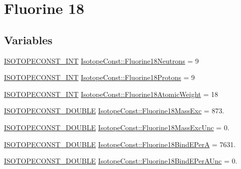 \hypertarget{group___isotope_const-_fluorine-_f18}{}\section{Fluorine 18}
\label{group___isotope_const-_fluorine-_f18}
\subsection*{Variables}
\begin{DoxyCompactItemize}
\item 
\mbox{\hyperlink{group___isotope_const-_macros_ga5f18360b3e99483a35c32d789e62621c}{I\+S\+O\+T\+O\+P\+E\+C\+O\+N\+S\+T\+\_\+\+I\+NT}} \mbox{\hyperlink{group___isotope_const-_fluorine-_f18_ga506a70b22d3e2956601e38613c1ca5b4}{Isotope\+Const\+::\+Fluorine18\+Neutrons}} = 9
\item 
\mbox{\hyperlink{group___isotope_const-_macros_ga5f18360b3e99483a35c32d789e62621c}{I\+S\+O\+T\+O\+P\+E\+C\+O\+N\+S\+T\+\_\+\+I\+NT}} \mbox{\hyperlink{group___isotope_const-_fluorine-_f18_ga873d120615b1c8858a5ec13a3f5d2007}{Isotope\+Const\+::\+Fluorine18\+Protons}} = 9
\item 
\mbox{\hyperlink{group___isotope_const-_macros_ga5f18360b3e99483a35c32d789e62621c}{I\+S\+O\+T\+O\+P\+E\+C\+O\+N\+S\+T\+\_\+\+I\+NT}} \mbox{\hyperlink{group___isotope_const-_fluorine-_f18_ga4f87f9fad76f501db14275934be1b205}{Isotope\+Const\+::\+Fluorine18\+Atomic\+Weight}} = 18
\item 
\mbox{\hyperlink{group___isotope_const-_macros_ga8f45a7272ce02c0b4c65c44636ed719a}{I\+S\+O\+T\+O\+P\+E\+C\+O\+N\+S\+T\+\_\+\+D\+O\+U\+B\+LE}} \mbox{\hyperlink{group___isotope_const-_fluorine-_f18_gad0d9092153e40f2c4358cfad3868503e}{Isotope\+Const\+::\+Fluorine18\+Mass\+Exc}} = 873.
\item 
\mbox{\hyperlink{group___isotope_const-_macros_ga8f45a7272ce02c0b4c65c44636ed719a}{I\+S\+O\+T\+O\+P\+E\+C\+O\+N\+S\+T\+\_\+\+D\+O\+U\+B\+LE}} \mbox{\hyperlink{group___isotope_const-_fluorine-_f18_ga5160f87e7fb32b18f3d0ea20bd4df568}{Isotope\+Const\+::\+Fluorine18\+Mass\+Exc\+Unc}} = 0.
\item 
\mbox{\hyperlink{group___isotope_const-_macros_ga8f45a7272ce02c0b4c65c44636ed719a}{I\+S\+O\+T\+O\+P\+E\+C\+O\+N\+S\+T\+\_\+\+D\+O\+U\+B\+LE}} \mbox{\hyperlink{group___isotope_const-_fluorine-_f18_gada16ca3e83863a861f338fd91041a089}{Isotope\+Const\+::\+Fluorine18\+Bind\+E\+PerA}} = 7631.
\item 
\mbox{\hyperlink{group___isotope_const-_macros_ga8f45a7272ce02c0b4c65c44636ed719a}{I\+S\+O\+T\+O\+P\+E\+C\+O\+N\+S\+T\+\_\+\+D\+O\+U\+B\+LE}} \mbox{\hyperlink{group___isotope_const-_fluorine-_f18_ga0eadab57a78bc03bbaafd0df26428f4f}{Isotope\+Const\+::\+Fluorine18\+Bind\+E\+Per\+A\+Unc}} = 0.

\end{DoxyCompactItemize}
